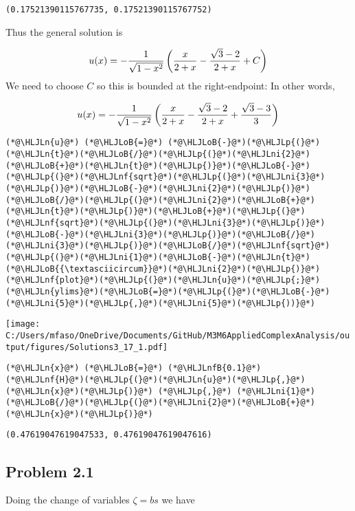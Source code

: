 \documentclass[12pt,landscape]{article}
\newcommand{\HLJLn}[1]{#1}
\newcommand{\HLJLnf}[1]{\textcolor[RGB]{66,102,213}{#1}}
\newcommand{\HLJLnfB}[1]{\textcolor[RGB]{59,151,46}{#1}}
\newcommand{\HLJLni}[1]{\textcolor[RGB]{59,151,46}{#1}}
\newcommand{\HLJLoB}[1]{\textcolor[RGB]{102,102,102}{\textbf{#1}}}
\newcommand{\HLJLp}[1]{#1}
\begin{document}
{\begin{lstlisting}
(0.17521390115767735, 0.17521390115767752)
\end{lstlisting}
\newpage

Thus the general solution is

\[
u(x) = -{1 \over \sqrt{1-x^2}} \left( {x\over 2+x} -{ \sqrt{3} -2 \over 2+x} + C \right)
\]
We need to choose $C$ so this is bounded at the right-endpoint: In other words,

\[
u(x) = -{1 \over \sqrt{1-x^2}} \left( {x\over 2+x} -{ \sqrt{3} -2 \over 2+x} +{ \sqrt{3} -3 \over 3}  \right)
\]

\begin{lstlisting}
(*@\HLJLn{u}@*) (*@\HLJLoB{=}@*) (*@\HLJLoB{-}@*)(*@\HLJLp{(}@*)(*@\HLJLn{t}@*)(*@\HLJLoB{/}@*)(*@\HLJLp{(}@*)(*@\HLJLni{2}@*)(*@\HLJLoB{+}@*)(*@\HLJLn{t}@*)(*@\HLJLp{)}@*)(*@\HLJLoB{-}@*)(*@\HLJLp{(}@*)(*@\HLJLnf{sqrt}@*)(*@\HLJLp{(}@*)(*@\HLJLni{3}@*)(*@\HLJLp{)}@*)(*@\HLJLoB{-}@*)(*@\HLJLni{2}@*)(*@\HLJLp{)}@*)(*@\HLJLoB{/}@*)(*@\HLJLp{(}@*)(*@\HLJLni{2}@*)(*@\HLJLoB{+}@*)(*@\HLJLn{t}@*)(*@\HLJLp{)}@*)(*@\HLJLoB{+}@*)(*@\HLJLp{(}@*)(*@\HLJLnf{sqrt}@*)(*@\HLJLp{(}@*)(*@\HLJLni{3}@*)(*@\HLJLp{)}@*)(*@\HLJLoB{-}@*)(*@\HLJLni{3}@*)(*@\HLJLp{)}@*)(*@\HLJLoB{/}@*)(*@\HLJLni{3}@*)(*@\HLJLp{)}@*)(*@\HLJLoB{/}@*)(*@\HLJLnf{sqrt}@*)(*@\HLJLp{(}@*)(*@\HLJLni{1}@*)(*@\HLJLoB{-}@*)(*@\HLJLn{t}@*)(*@\HLJLoB{{\textasciicircum}}@*)(*@\HLJLni{2}@*)(*@\HLJLp{)}@*)
(*@\HLJLnf{plot}@*)(*@\HLJLp{(}@*)(*@\HLJLn{u}@*)(*@\HLJLp{;}@*) (*@\HLJLn{ylims}@*)(*@\HLJLoB{=}@*)(*@\HLJLp{(}@*)(*@\HLJLoB{-}@*)(*@\HLJLni{5}@*)(*@\HLJLp{,}@*)(*@\HLJLni{5}@*)(*@\HLJLp{))}@*)
\end{lstlisting}

\texttt{[image: C:/Users/mfaso/OneDrive/Documents/GitHub/M3M6AppliedComplexAnalysis/output/figures/Solutions3\_17\_1.pdf]}

\begin{lstlisting}
(*@\HLJLn{x}@*) (*@\HLJLoB{=}@*) (*@\HLJLnfB{0.1}@*)
(*@\HLJLnf{H}@*)(*@\HLJLp{(}@*)(*@\HLJLn{u}@*)(*@\HLJLp{,}@*)(*@\HLJLn{x}@*)(*@\HLJLp{)}@*) (*@\HLJLp{,}@*) (*@\HLJLni{1}@*)(*@\HLJLoB{/}@*)(*@\HLJLp{(}@*)(*@\HLJLni{2}@*)(*@\HLJLoB{+}@*)(*@\HLJLn{x}@*)(*@\HLJLp{)}@*)
\end{lstlisting}

\begin{lstlisting}
(0.47619047619047533, 0.47619047619047616)
\end{lstlisting}


\subsection{Problem 2.1}
Doing the change of variables $\zeta = b s$ we have

}
\end{document}
